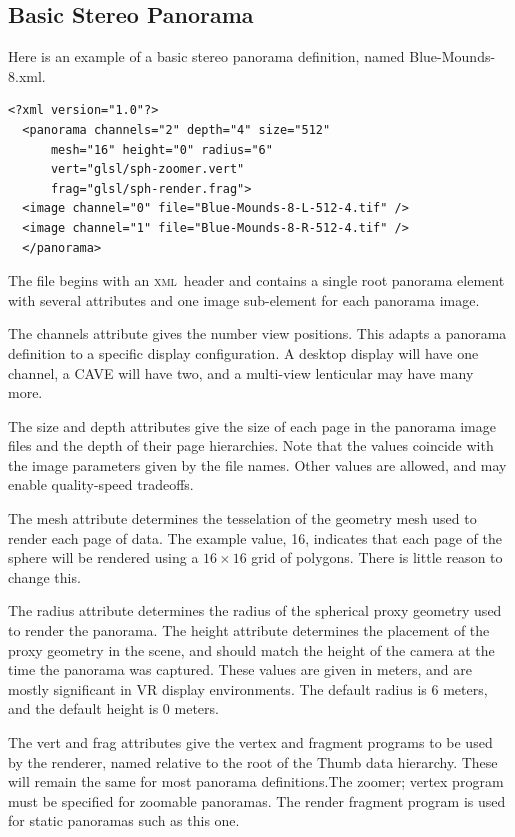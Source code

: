 \documentclass[oneside,11pt]{memoir}
\newcommand{\xml}     {\textsc{xml}}
\begin{document}
\begin{Spacing}{1.1}
\subsection{Basic Stereo Panorama}

Here is an example of a basic stereo panorama definition, named Blue-Mounds-8.xml.

\begin{verbatim}
<?xml version="1.0"?>
  <panorama channels="2" depth="4" size="512"
      mesh="16" height="0" radius="6"
      vert="glsl/sph-zoomer.vert"
      frag="glsl/sph-render.frag">
  <image channel="0" file="Blue-Mounds-8-L-512-4.tif" />
  <image channel="1" file="Blue-Mounds-8-R-512-4.tif" />
  </panorama>
\end{verbatim}

The file begins with an \xml\ header and contains a single root panorama element with several attributes and one image sub-element for each panorama image.

The channels attribute gives the number view positions. This adapts a panorama definition to a specific display configuration. A desktop display will have one channel, a CAVE will have two, and a multi-view lenticular may have many more.

The size and depth attributes give the size of each page in the panorama image files and the depth of their page hierarchies. Note that the values coincide with the image parameters given by the file names. Other values are allowed, and may enable quality-speed tradeoffs.

The mesh attribute determines the tesselation of the geometry mesh used to render each page of data. The example value, 16, indicates that each page of the sphere will be rendered using a $16\times 16$ grid of polygons. There is little reason to change this.

The radius attribute determines the radius of the spherical proxy geometry used to render the panorama. The height attribute determines the placement of the proxy geometry in the scene, and should match the height of the camera at the time the panorama was captured. These values are given in meters, and are mostly significant in VR display environments. The default radius is 6 meters, and the default height is 0 meters.

The vert and frag attributes give the vertex and fragment programs to be used by the renderer, named relative to the root of the Thumb data hierarchy. These will remain the same for most panorama definitions.The zoomer; vertex program must be specified for zoomable panoramas. The render fragment program is used for static panoramas such as this one.


\end{Spacing}
\end{document}
